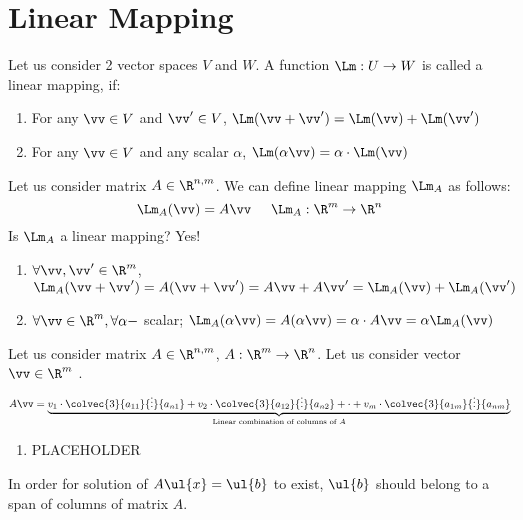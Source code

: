 \chapter{Linear Mapping}
\begin{definition}
Let us consider 2 vector spaces $V$ and $W$. A function $\Lm:U\to W$ is called a linear mapping, if:
\begin{enumerate}
\item For any $\vv\in V$ and $\vv'\in V$, $\Lm(\vv+\vv') = \Lm(\vv)+\Lm(\vv')$
\item For any $\vv\in V$ and any scalar $\alpha$, $\Lm (\alpha\vv) = \alpha\cdot\Lm(\vv)$
\end{enumerate}
\end{definition}
\begin{example}
Let us consider matrix $A\in\R^{n,m}$. We can define linear mapping $\Lm_A$ as follows:
\[
\Lm_A(\vv) = A\vv\hspace{5mm}\Lm_A:\R^m\to\R^n
\]	
Is $\Lm_A$ a linear mapping? Yes!
\begin{enumerate}
\item $\forall \vv,\vv'\in\R^m$, $\Lm_A(\vv+\vv') = A(\vv+\vv') = A\vv+A\vv' = \Lm_A(\vv) + \Lm_A(\vv')$
\item $\forall\vv\in\R^m,\forall\alpha-$ scalar; $\Lm_A(\alpha\vv) = A(\alpha\vv) = \alpha\cdot A\vv = \alpha \Lm_A(\vv)$
\end{enumerate}
\end{example}
Let us consider matrix $A\in\R^{n,m}$, $A:\R^m\to\R^n$. Let us consider vector $\vv\in\R^m$
.
\[
A\vv = \underbrace{v_1\cdot\colvec{3}{a_{11}}{\vdots}{a_{n1}} + v_2\cdot\colvec{3}{a_{12}}{\vdots}{a_{n2}}+ \cdot + v_m\cdot\colvec{3}{a_{1m}}{\vdots}{a_{nm}}}_{\text{Linear combination of columns of $A$}}
\]

\begin{example}
\begin{enumerate}
\item PLACEHOLDER\\
\end{enumerate}
	
\end{example}

\begin{note}
In order for solution of $A\ul{x} = \ul{b}$ to exist, $\ul{b}$ should belong to a span of columns of matrix $A$.	
\end{note}

